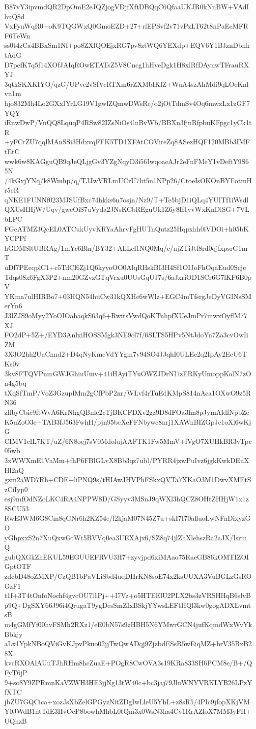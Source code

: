 B87vY3ipvmdQR2DpOmE2eJQZjogVDjfXftDBQqC6QfaaUKJR0kNnBW+VAdIhuQ8d
VxFynWqR0+oK9TQGWxQ0GmoEZD+27+rlEPSvf2v71vPzLT62t8nPaEcMFRF6TeWn
ss0t4zCa4BBxSm1Nf+po8ZXlQOEjxRG7pv8ztWQ6YEXdp+EQV6Y1BJznDbnhtAdG
D7pefK7q5f14XOfJAIqROwETATsZ5V8Cncg1hHveDgk1H8xlRfDAynwTFrauRXYJ
3qtkSKXKIYO/qzG/UPve2vSfVcRTXm6rZXMbIKfZ+WuA4szAhMdi9qLOeKnlvn1m
hjo832Mh4Lo2GXxIYrLG19V1gwlZQmwDWsRe/o2jOtTdmSv4Oq6mwzLx1zGF7YQY
iRuwDwP/VnQQ8LquqP4RSw82IZsNiOs4lnBvWb/BBXn3fjnRfpbuKFpgc1yCk1tR
+yFCrZU7qqlMAnSSi3HdxvqFFK5TD1XFAtCOVireZq8ASezHQF120MBb3IMFtEtC
wwk6w8KAGguQB9qJeQLjgGv3YZgNqyD3i56IwqoaeAJr2eFnFMeY1vDeftY9S65N
/4kGxjYNq/k8Wmhp/q/TJJwVRLmUCrU7ht5n1NPp26/CtoeIsOKOnBYEotmHr5eR
qNKE1FUNNf023MJSUfBxc74hkks6n7osjn/Nz9/T+Te5bjD1iQLq4YUITf1iWsdl
QXUsHHjW/Uqv/gweOiS7uVyda2JNsKCbREguUk1Z6y8If1yvWxKnDlSG+7VLbLPC
FGeATMZ3QcEL0ATCukUyvKRYaAhrvFgHUTnQutz25Hqpxhh0iVDOi+h05bKYCPPf
hGDMSltUBRAg/1mYc6Bln/BY32+ALLcl1NQ0Mq/c/njZTiJtf8rd0qjfxpsrG1mT
uDf7PEeqplC1+c5TdCl6Zj1Q6kyvoOO0AlqRHskBI3H4Sf1OIJoFhOqaEud0Scje
Tdqs08x6FgX3P2+nm20GZvzGTqVrxu0UUsGqUJ7s/6aJxriOD1SCr6G7lKF6B0pV
YKma7ulHIRBo7+03HQN54huCw31kQXHe6wWlz+EGC4mTfsrgJeDyVGINsSMerYn6
J3lZJS9oMyy2YoOIOahaqkS63q6+RwirsVwdQoKTnhpfXUeJmPr7mwxOyflM77XJ
FO2dP+5Z+/EYD3AnlxiHOSSMgk3NE9cl7f/6SLTS5HPv5NtJdoYn7Za3cvOwIiZM
3X3O2hh2UaCnnd2+D4qNyKmcVdYYgm7v94SO4JJqhI0ULEe2q2IpAy2EcU6TKs0v
3kv8FTQVPnmGWJGhiuUmv+41iHAyiTYuOWZJDrNI1zERKyUmoppKolN7zOn4g5bq
tXqSfTmP/VoZ3GzuplMm2gCfPbP2nr/WLvf4rTuEdKMpS814nAca1OXwO9z5RN36
zlfbyCbic9ftWvA6KrNhgQBnle2cTjBKCFDXv2gz9D8dFOa3hn8pJymAldfNpbZe
K5uZoO3e+TAB3fJ563FwhH/pjn95beXeFFNbywc8nrj1XAWnBIZGpJc1oXl6wKjG
CIMV1cIL7KT/uZ/6N8oej7sV0MdolujAAFTK1Fw5MmV+fVgO7XUHkBR3vTpe05wb
3xWWXmE1VaMm+fhP6FBlGLvX8Bb3qz7ubl/PYRR4jzwPuIvz6jgkKwkDEuXHl2aQ
gzm2aWD7Rh+CDE+liPNQ9s/tHIAwJHVPhFSkxQVTa7XKaO3M1DwvXMEtSzCiIyp0
esj9mfOdNZoLKC4RA4NPPW8D/GSyyv3MSnJ9qWXl3hQCZ8OHtZHHjW1x1z8SCU53
RwE3WM6G8Cm8qGNr6h2KZ54c/l2kjaM07N45Z7u+skI7I70afluoLwNFnDixyzGO
yGhpxxS2n7XuQxwGtWt5BVVq0ea3UEXAjx6/SZ8q74jlZhXlehszRa2aJX/IsrmQ
gubQXGkZhEKUL59EGUUEFRVU3H7+zyvjpd6xiMAao75RaeGB86kOMTIZOIGptOTF
zdcbD48oZMXP/CzQB1bPaVLiSbd4uqDHrKN8soE74x2ksUUXA3VuBGLzGsROGzF1
t1f+3T4tOnfoNochf4gvcOU7l1Pj++I7Vz+o5HTEElU2PLX2bs3zVRSHHqB6slvB
p9Q+DgSXY66J96i4QrugaT9ygDesSmZIxBSkjYYwsLEFtHQl3kw0gogADXLvmtsB
m4gGMfYf00hvFSMh2RXz1/eE0bN57s9zHBH5N6YMwrGCN4jufKqmdWxWvYkBbkjy
aLx1YpkNBoQViGvKJpvPkuo02jjTwQwADqj9ZjzbdESsR5wEiqMZ+brV35BxB28X
kvcRXOAlAUuTJhRHm8hcZuaE+POgR8CwOVA3s19KRa833SH6PCM8e/B+/QFyT6jP
9+so8Y9ZPRmnKaVZWH3HE3jjNg13tW40c+bc3jaj79JluWNYVRKLYB26LPzYfXTC
jbZU7GQCica+xozJsXbZelGPGyzNitZDgIwLleU5YhL+z8sR5/4PIc9jfopXKjVM
Y0JWdB1ntTdE3HvOcP8bowhMhbL0tQm3x0WsN3ha4Cv1RrAZloX7MM3yFH+UQhzB
